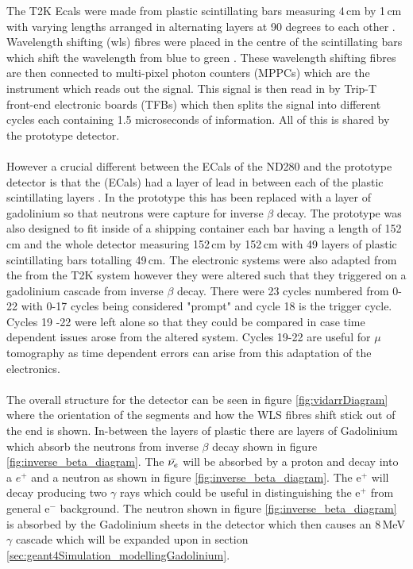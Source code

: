 The T2K Ecals were made from plastic scintillating bars measuring 4\,cm by 1\,cm with varying lengths arranged in alternating layers at 90 degrees to each other \cite{Allan_2013}. Wavelength shifting (wls) fibres were placed in the centre of the scintillating bars which shift the wavelength from blue to green \cite{Allan_2013}. These wavelength shifting fibres are then connected to multi-pixel photon counters (MPPCs) which are the instrument which reads out the signal. This signal is then read in by Trip-T front-end electronic boards (TFBs) which then splits the signal into different cycles each containing 1.5 microseconds of information. All of this is shared by the prototype detector. 
\\\\However a crucial different between the ECals of the ND280 and the prototype detector is that the (ECals) had a layer of lead in between each of the plastic scintillating layers \cite{Allan_2013}. In the prototype this has been replaced with a layer of gadolinium so that neutrons were capture for inverse $\beta$ decay. The prototype was also designed to fit inside of a shipping container each bar having a length of 152\,cm and the whole detector measuring 152\,cm by 152\,cm with 49 layers of plastic scintillating bars totalling 49\,cm. The electronic systems were also adapted from the from the T2K system however they were altered such that they triggered on a gadolinium cascade from inverse $\beta$ decay. There were 23 cycles numbered from 0-22 with 0-17 cycles being considered "prompt" and cycle 18 is the trigger cycle. Cycles 19 -22 were left alone so that they could be compared in case time dependent issues arose from the altered system. Cycles 19-22 are useful for $\mu$ tomography as time dependent errors can arise from this adaptation of the electronics. \\\\The overall structure for the detector can be seen in figure \ref{fig:vidarrDiagram} where the orientation of the segments and how the WLS fibres shift stick out of the end is shown. In-between the layers of plastic there are layers of Gadolinium which absorb the neutrons from inverse $\beta$ decay shown in figure \ref{fig:inverse_beta_diagram}. The $\Bar{\nu_e}$ will be absorbed by a proton and decay into a $e^+$ and a neutron as shown in figure \ref{fig:inverse_beta_diagram}. The e$^+$ will decay producing two $\gamma$ rays which could be useful in distinguishing the e$^+$ from general e$^-$ background. The neutron shown in figure \ref{fig:inverse_beta_diagram} is absorbed by the Gadolinium sheets in the detector which then causes an 8\,MeV $\gamma$ cascade which will be expanded upon in section \ref{sec:geant4Simulation_modellingGadolinium}.  

